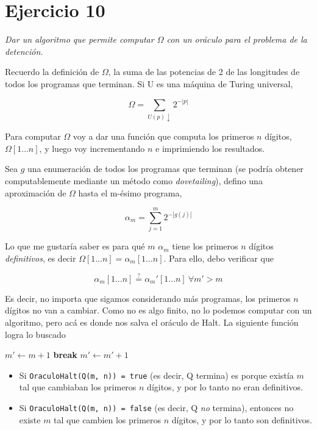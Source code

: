 \documentclass{article}
\theoremstyle{definition} %
\newcommand{\progends}{\downarrow}
\newcommand{\firstn}[1]{\first{n}{#1}}
\newcommand{\first}[2]{#2[1 \dots #1]}
\begin{document}
\section*{Ejercicio 10}

\textit{Dar un algoritmo que permite computar $\Omega$ con un oráculo para el problema de la detención.}

Recuerdo la definición de $\Omega$, la suma de las potencias de 2 de las
longitudes de todos los programas que terminan. Si U es una máquina de Turing
universal,

\[
    \Omega = \sum_{U(p)\progends} 2 ^ {-|p|}
\]

Para computar $\Omega$ voy a dar una función que computa los primeros $n$
dígitos, $\firstn{\Omega}$, y luego voy incrementando $n$ e imprimiendo los
resultados.

Sea $g$ una enumeración de todos los programas que terminan (se
podría obtener computablemente mediante un método como \textit{dovetailing}),
defino una aproximación de $\Omega$ hasta el m-ésimo programa,

\[
    \alpha_m = \sum_{j = 1}^{m} 2 ^ {-|g(j)|}
\]

Lo que me gustaría saber es para qué $m$ $\alpha_m$ tiene los primeros $n$
dígitos \textit{definitivos}, es decir $\firstn{\Omega} = \firstn{\alpha_m}$.
Para ello, debo verificar que

\[
    \firstn{\alpha_m} \overset{?}{=} \firstn{\alpha_m'}\ \forall m' > m
\]

Es decir, no importa que sigamos considerando más programas, los primeros $n$
dígitos no van a cambiar. Como no es algo finito, no lo podemos computar con un
algoritmo, pero acá es donde nos salva el oráculo de Halt. La siguiente función
logra lo buscado

\begin{algorithmic}
        \State $m' \gets m + 1$
            \If{$\firstn{\alpha_m} \neq \firstn{\alpha_m'}$}
            \State \textbf{break}
            \EndIf
            \State $m' \gets m' + 1$
        \EndWhile
    \EndFunction
\end{algorithmic}

\begin{itemize}
    \item Si \texttt{OraculoHalt(Q(m, n)) = true} (es decir, Q termina) es
    porque existía $m$ tal que cambiaban los primeros $n$ dígitos, y por lo
    tanto no eran definitivos.

    \item Si \texttt{OraculoHalt(Q(m, n)) = false} (es decir, Q \textit{no}
    termina), entonces no existe $m$ tal que cambien los primeros $n$ dígitos, y
    por lo tanto son definitivos.
\end{itemize}
\end{document}
